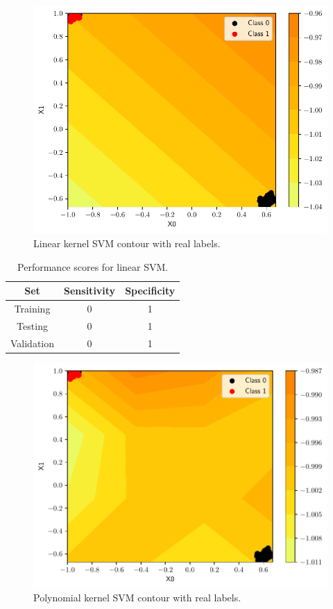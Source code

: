 \documentclass[conference]{IEEEtran}
\theoremstyle{definition}
\theoremstyle{remark}
\theoremstyle{remark}
\begin{document}
\begin{figure}
  \includegraphics[width=\columnwidth]{figs/svm-emb-linear-contour-0-1.pdf}
  \caption{Linear kernel SVM contour with real labels.}
\end{figure}

\begin{table}
\centering
\caption{Performance scores for linear SVM.}
\label{tab:linear_SVM_emb}
\begin{tabular}{ccc}
\hline
\textbf{Set} & \textbf{Sensitivity} & \textbf{Specificity} \\ \hline
Training & 0 & 1 \\
Testing & 0 & 1 \\
Validation & 0 & 1 \\ \hline
\end{tabular}
\end{table}

\begin{figure}
  \includegraphics[width=\columnwidth]{figs/svm-emb-poly-contour-0-1.pdf}
  \caption{Polynomial kernel SVM contour with real labels.}
\end{figure}
\end{document}
